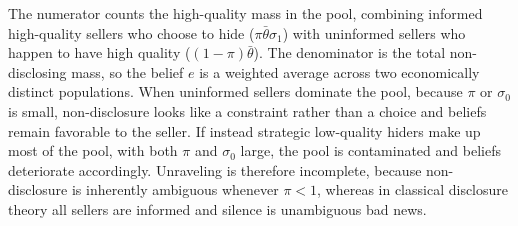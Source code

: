 The numerator counts the high-quality mass in the pool, combining informed high-quality sellers who choose to hide ($\pi\bar{\theta}\sigma_1$) with uninformed sellers who happen to have high quality ($(1-\pi)\bar{\theta}$). The denominator is the total non-disclosing mass, so the belief $e$ is a weighted average across two economically distinct populations. When uninformed sellers dominate the pool, because $\pi$ or $\sigma_0$ is small, non-disclosure looks like a constraint rather than a choice and beliefs remain favorable to the seller. If instead strategic low-quality hiders make up most of the pool, with both $\pi$ and $\sigma_0$ large, the pool is contaminated and beliefs deteriorate accordingly. Unraveling is therefore incomplete, because non-disclosure is inherently ambiguous whenever $\pi < 1$, whereas in classical disclosure theory all sellers are informed and silence is unambiguous bad news.

